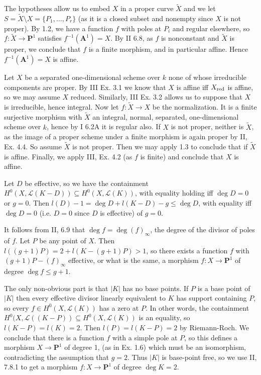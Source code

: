 \documentclass{report}
\renewcommand{\P}{\mathbf{P}}
\renewcommand{\L}{\mathscr{L}}
\newcommand{\A}{\mathbf{A}}
\begin{document}
\bigskip
{}	The hypotheses allow us to embed $X$ in a proper curve $\widetilde{X}$ and we let $S=\widetilde{X}\setminus X=\{P_1,\ldots,P_r\}$
(as it is a closed subset and nonempty since $X$ is not proper).  
By 1.2, we have a function $f$ with poles at $P_i$ and regular elsewhere, so $f:\widetilde{X}\rightarrow \P^1$
satisfies $f^{-1}(\A^1)=X$.  By II 6.8, as $f$ is nonconstant and $\widetilde{X}$ is proper, we conclude that
$f$ is a finite morphism, and in particular affine.  Hence $f^{-1}(\A^1)=X$ is affine. 

\bigskip
{}	Let $X$ be a separated one-dimensional scheme over $k$ none of whose irreducible components are proper.
By III Ex. 3.1 we know that $X$ is affine iff $X_{\rm red}$ is affine, so we may assume $X$ reduced.  Similarly,
III Ex. 3.2 allows us to suppose that $X$ is irreducible, hence integral.  Now let $f:\widetilde{X}\rightarrow X$
be the normalization.  It is a finite surjective morphism with $\widetilde{X}$ an integral, normal, separated, one-dimensional
scheme over $k$, hence by I 6.2A it is regular also.
If $X$ is not proper, neither is $\widetilde{X}$, as the image of a proper scheme under a finite morphism is again proper
by II, Ex. 4.4.
So assume $\widetilde{X}$ is not proper.  Then we may apply 1.3 to conclude that if $\widetilde{X}$ is affine.
Finally, we apply III, Ex. 4.2 (as $f$ is finite) and conclude that $X$ is affine.

\bigskip
{}	Let $D$ be effective, so we have the containment $H^0(X,\L(K-D))\subseteq H^0(X,\L(K))$, with equality holding
iff $\deg D=0$ or $g=0$.  Then $l(D)-1=\deg D + l(K-D)-g \leq \deg D$, with equality iff $\deg D=0$ (i.e. $D=0$ since $D$ is effective)
of $g=0$.

\bigskip
{}	It follows from II, 6.9 that $\deg f=\deg (f)_{\infty}$, the degree of the divisor of poles of $f$.
Let $P$ be any point of $X$.  Then $l((g+1)P)=2+l(K-(g+1)P)>1$, so there exists a function $f$
with $(g+1)P-(f)_{\infty}$ effective, or what is the same, a morphism $f:X\rightarrow \P^1$
of degree $\deg f\leq g+1$.

\bigskip
{}	The only non-obvious part is that $|K|$ has no base points.  If $P$ is a base point
of $|K|$ then every effective divisor linearly equivalent to $K$ has support containing $P$,
so every $f\in H^0(X,\L(K))$ has a zero at $P$.  In other words,
the containment $H^0(X,\L((K-P))\subseteq H^0(X,\L(K))$ is an equality, so $l(K-P)=l(K)=2$.
Then $l(P)=l(K-P)=2$ by Riemann-Roch.  We conclude that there is a function $f$ with
a simple pole at $P$, so this defines a morphism $X\rightarrow \P^1$ of degree 1,
(as in Ex. 1.6) which must be an isomorphism, contradicting the assumption that $g=2$.
Thus $|K|$ is base-point free, so we use II, 7.8.1 to get a morphism $f:X\rightarrow \P^1$
of degree $\deg K=2$. 
\end{document}
